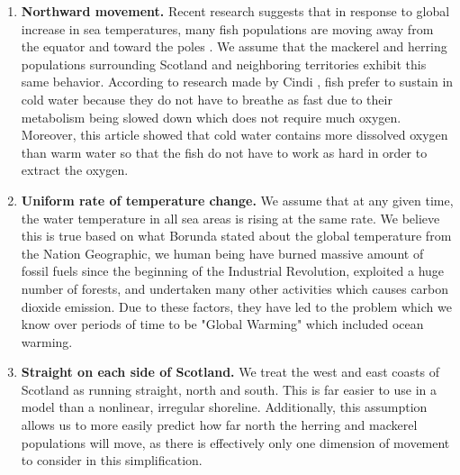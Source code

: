 \documentclass[12pt]{article}
\begin{document}
\begin{enumerate}
    \item \textbf{Northward movement.} Recent research suggests that in response to global increase in sea temperatures, many fish populations are moving away from the equator and toward the poles \cite{findlay_2020, gigy_smalls}. We assume that the mackerel and herring populations surrounding Scotland and neighboring territories exhibit this same behavior. According to research made by Cindi \cite{Cindi}, fish prefer to sustain in cold water because they do not have to breathe as fast due to their metabolism being slowed down which does not require much oxygen. Moreover, this article \cite{Cindi} showed that cold water contains more dissolved oxygen than warm water so that the fish do not have to work as hard in order to extract the oxygen. 
    \item \textbf{Uniform rate of temperature change.} We assume that at any given time, the water temperature in all sea areas is rising at the same rate. We believe this is true based on what Borunda \cite{borunda} stated about the global temperature from the Nation Geographic, we human being have burned massive amount of fossil fuels since the beginning of the Industrial Revolution, exploited a huge number of forests, and undertaken many other activities which causes carbon dioxide emission. Due to these factors, they have led to the problem which we know over periods of time to be "Global Warming" which included ocean warming. 
    
    \item \textbf{Straight on each side of Scotland.} We treat the west and east coasts of Scotland as running straight, north and south. This is far easier to use in a model than a nonlinear, irregular shoreline. Additionally, this assumption allows us to more easily predict how far north the herring and mackerel populations will move, as there is effectively only one dimension of movement to consider in this simplification.
    

\end{enumerate}
\end{document}

